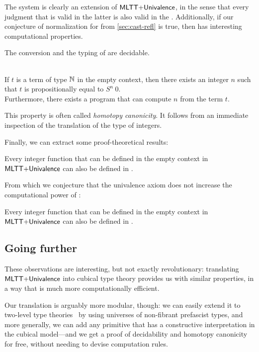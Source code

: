 The system \HoTTminus is clearly an extension of \( \mathsf{MLTT}{+}\mathsf{Univalence} \),
in the sense that every judgment that is valid in the latter is also valid in the 
\HoTTminus.
% 
Additionally, if our conjecture of normalization for \SetoidCCplus from 
\cref{sec:cast-refl} is true, then \HoTTminus has interesting computational 
properties.

\begin{theorem}
    The conversion and the typing of \HoTTminus are decidable.
\end{theorem}

\begin{theorem} \phantom{.}\\
    If \( t \) is a term of type \( \mathbb{N} \) in the empty context, then there 
    exists an integer \( n \) such that \( t \) is propositionally equal to 
    \( S^n~0 \). \\
    Furthermore, there exists a program that can compute \( n \) from the term \( t \).
\end{theorem}

This property is often called \emph{homotopy canonicity}. It follows from an
immediate inspection of the translation of the type of integers.

Finally, we can extract some proof-theoretical results:

\begin{theorem}
    Every integer function that can be defined in the empty context in 
    \( \mathsf{MLTT}{+}\mathsf{Univalence} \) can also be defined in \SetoidCCplus.
\end{theorem}

From which we conjecture that the univalence axiom does not increase the
computational power of \MLTT:

\begin{conjecture}
    Every integer function that can be defined in the empty context in 
    \( \mathsf{MLTT}{+}\mathsf{Univalence} \) can also be defined in \MLTT.
\end{conjecture}

\subsection{Going further}

These observations are interesting, but not exactly revolutionary: translating
\( \mathsf{MLTT}{+}\mathsf{Univalence} \) into cubical type theory provides us
with similar properties, in a way that is much more computationally efficient.

Our translation is arguably more modular, though: we can easily extend it to
two-level type theories~ 
by using universes of non-fibrant prefascist types,
and more generally, we can add any primitive that has a constructive interpretation 
in the cubical model---and we get a proof of decidability and homotopy canonicity 
for free, without needing to devise computation rules.